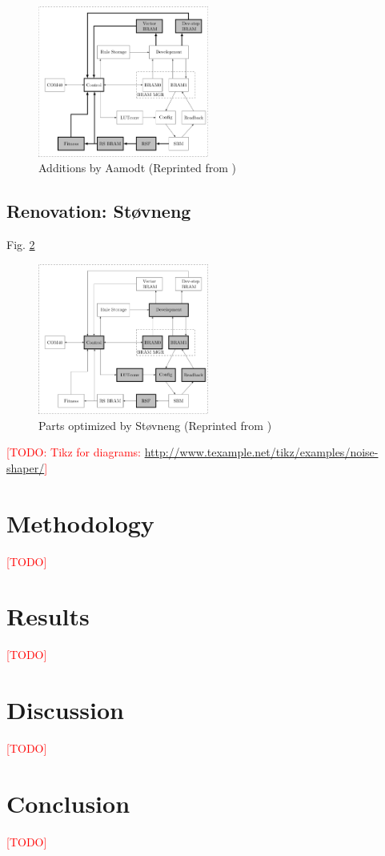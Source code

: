 \documentclass[a4paper]{IEEEtran}
\newcommand\TODO{\textcolor{red}{[TODO]}}
\newcommand\todo[1]{\textcolor{red}{[TODO: #1]}}
\begin{document}
\begin{figure}[h!]
    \centering
    \includegraphics[width=0.5\textwidth]{figures/ca-aamodt}
    \caption{Additions by Aamodt (Reprinted from \cite{stovneng2014sblock})}
    \label{fig:ca-aamodt}
\end{figure}

\subsection{Renovation: Støvneng \cite{stovneng2014sblock}}

Fig. \ref{fig:ca-stovneng}

\begin{figure}[h!]
    \centering
    \includegraphics[width=0.5\textwidth]{figures/ca-stovneng}
    \caption{Parts optimized by Støvneng (Reprinted from \cite{stovneng2014sblock})}
    \label{fig:ca-stovneng}
\end{figure}

\todo{Tikz for diagrams: \url{http://www.texample.net/tikz/examples/noise-shaper/}}

\section{Methodology}

\TODO

\section{Results}

\TODO

\section{Discussion}

\TODO

\section{Conclusion}

\TODO



\end{document}
